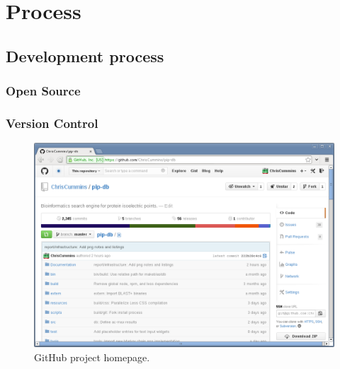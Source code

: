 \chapter{Process}\label{chap:process}


\section{Development process}


\cite{martin2003agile, highsmith2001agile}


\cite{balduino2007introduction, kroll2006agility}


\subsection{Open Source}

\cite{raymond1999cathedral, weber2004success}


\subsection{Version Control}

\cite{finley2011github}


\begin{figure}[H]
\centering
    \includegraphics[width=\textwidth]{assets/github}
\caption[GitHub project homepage]
        {GitHub project homepage.}
\label{fig:github-project}
\end{figure}


